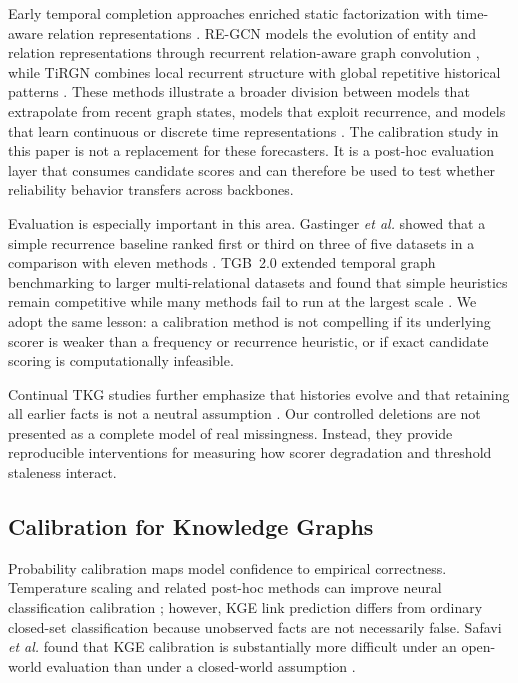 \documentclass[10pt,twocolumn]{article}
\begin{document}
Early temporal completion approaches enriched static factorization with
time-aware relation representations \cite{garciaduran2018sequence}. RE-GCN
models the evolution of entity and relation representations through recurrent
relation-aware graph convolution \cite{li2021regcn}, while TiRGN combines local
recurrent structure with global repetitive historical patterns
\cite{li2022tirgn}. These methods illustrate a broader division between models
that extrapolate from recent graph states, models that exploit recurrence, and
models that learn continuous or discrete time representations
\cite{cai2023survey}. The calibration study in this paper is not a replacement
for these forecasters. It is a post-hoc evaluation layer that consumes candidate
scores and can therefore be used to test whether reliability behavior transfers
across backbones.

Evaluation is especially important in this area. Gastinger \emph{et al.}
showed that a simple recurrence baseline ranked first or third on three of five
datasets in a comparison with eleven methods \cite{gastinger2024repeat}. TGB~2.0
extended temporal graph benchmarking to larger multi-relational datasets and
found that simple heuristics remain competitive while many methods fail to run
at the largest scale \cite{gastinger2024tgb2}. We adopt the same lesson: a
calibration method is not compelling if its underlying scorer is weaker than a
frequency or recurrence heuristic, or if exact candidate scoring is
computationally infeasible.

Continual TKG studies further emphasize that histories evolve and that retaining
all earlier facts is not a neutral assumption
\cite{mirtaheri2023continual,zhang2025replay}. Our controlled deletions are not
presented as a complete model of real missingness. Instead, they provide
reproducible interventions for measuring how scorer degradation and threshold
staleness interact.

\subsection{Calibration for Knowledge Graphs}

Probability calibration maps model confidence to empirical correctness.
Temperature scaling and related post-hoc methods can improve neural
classification calibration \cite{guo2017calibration}; however, KGE link
prediction differs from ordinary closed-set classification because unobserved
facts are not necessarily false. Safavi \emph{et al.} found that KGE
calibration is substantially more difficult under an open-world evaluation than
under a closed-world assumption \cite{safavi2020calibration}.
\end{document}
